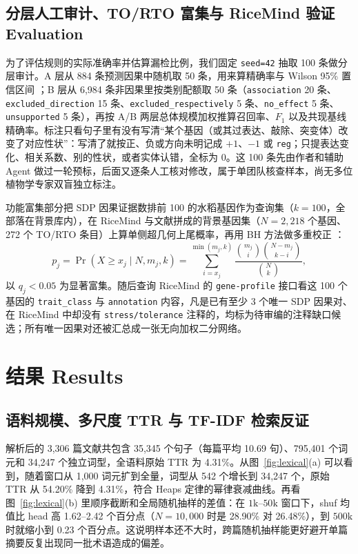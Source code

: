\documentclass[conference]{IEEEtran}
\begin{document}
\subsection{分层人工审计、TO/RTO 富集与 RiceMind 验证 Evaluation}
为了评估规则的实际准确率并估算漏检比例，我们固定 \texttt{seed=42} 抽取 100 条做分层审计。A 层从 884 条预测因果中随机取 50 条，用来算精确率与 Wilson 95\% 置信区间 \cite{wilson1927}；B 层从 6,984 条非因果里按类别配额取 50 条（\texttt{association} 20 条、\texttt{excluded\_direction} 15 条、\texttt{excluded\_respectively} 5 条、\texttt{no\_effect} 5 条、\texttt{unsupported} 5 条），再按 A/B 两层总体规模加权推算召回率、$F_1$ 以及共现基线精确率。标注只看句子里有没有写清“某个基因（或其过表达、敲除、突变体）改变了对应性状”：写清了就按正、负或方向未明记成 $+1$、$-1$ 或 \texttt{reg}；只提表达变化、相关系数、别的性状，或者实体认错，全标为 $0$。这 100 条先由作者和辅助 Agent 做过一轮预标，后面又逐条人工核对修改，属于单团队核查样本，尚无多位植物学专家双盲独立标注。

功能富集部分把 SDP 因果证据数排前 100 的水稻基因作为查询集（$k=100$，全部落在背景库内），在 RiceMind 与文献拼成的背景基因集（$N=2{,}218$ 个基因、272 个 TO/RTO 条目）上算单侧超几何上尾概率，再用 BH 方法做多重校正 \cite{huang2009,benjamini1995bh}：
\begin{equation}
p_j = \Pr(X \ge x_j \mid N, m_j, k) = \sum_{i=x_j}^{\min(m_j, k)} \frac{\binom{m_j}{i}\binom{N-m_j}{k-i}}{\binom{N}{k}},
\label{eq:hyper}
\end{equation}
以 $q_j < 0.05$ 为显著富集。随后查询 RiceMind 的 \texttt{gene-profile} 接口看这 100 个基因的 \texttt{trait\_class} 与 \texttt{annotation} 内容，凡是已有至少 3 个唯一 SDP 因果对、在 RiceMind 中却没有 \texttt{stress/tolerance} 注释的，均标为待审编的注释缺口候选；所有唯一因果对还被汇总成一张无向加权二分网络。

\section{结果 Results}

\subsection{语料规模、多尺度 TTR 与 TF-IDF 检索反证}
解析后的 3,306 篇文献共包含 35,345 个句子（每篇平均 10.69 句）、795,401 个词元和 34,247 个独立词型，全语料原始 TTR 为 4.31\%。从图~\ref{fig:lexical}(a) 可以看到，随着窗口从 1,000 词元扩到全量，词型从 542 个增长到 34,247 个，原始 TTR 从 54.20\% 降到 4.31\%，符合 Heaps 定律的幂律衰减曲线。再看图~\ref{fig:lexical}(b) 里顺序截断和全局随机抽样的差值：在 $1\text{k}$--$50\text{k}$ 窗口下，shuf 均值比 head 高 1.62--2.42 个百分点（$N=10{,}000$ 时是 28.90\% 对 26.48\%），到 $500\text{k}$ 时就缩小到 0.23 个百分点。这说明样本还不大时，跨篇随机抽样能更好避开单篇摘要反复出现同一批术语造成的偏差。
\end{document}
